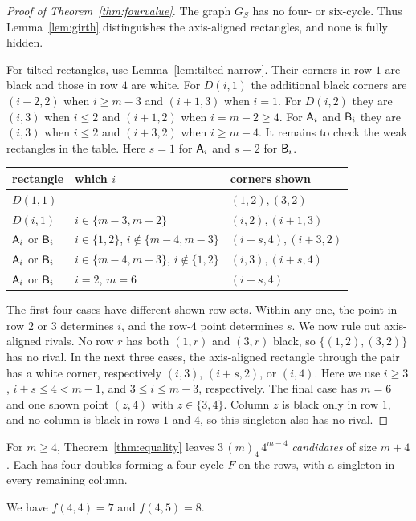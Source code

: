 \begin{proof}[Proof of Theorem~\ref{thm:fourvalue}]
The graph $G_S$ has no four- or six-cycle. Thus Lemma~\ref{lem:girth}
distinguishes the axis-aligned rectangles, and none is fully hidden.

For tilted rectangles, use Lemma~\ref{lem:tilted-narrow}.
Their corners in row $1$ are black and those in row $4$ are white.
For $D(i,1)$ the additional black corners are $(i+2,2)$ when $i\ge m-3$
and $(i+1,3)$ when $i=1$. For $D(i,2)$ they are $(i,3)$ when $i\le2$
and $(i+1,2)$ when $i=m-2\ge4$. For $\mathsf{A}_i$ and $\mathsf{B}_i$ they are
$(i,3)$ when $i\le2$ and $(i+3,2)$ when $i\ge m-4$.
It remains to check the weak rectangles in the table. Here $s=1$ for $\mathsf{A}_i$
and $s=2$ for $\mathsf{B}_i$.
\begin{center}\small
\begin{tabular}{@{}lll@{}}
\toprule
rectangle & which $i$ & corners shown\\
\midrule
$D(1,1)$ & & $(1,2),(3,2)$\\
$D(i,1)$ & $i\in\{m-3,m-2\}$ & $(i,2),(i+1,3)$\\
$\mathsf{A}_i$ or $\mathsf{B}_i$ & $i\in\{1,2\}$, $i\notin\{m-4,m-3\}$ & $(i+s,4),(i+3,2)$\\
$\mathsf{A}_i$ or $\mathsf{B}_i$ & $i\in\{m-4,m-3\}$, $i\notin\{1,2\}$ & $(i,3),(i+s,4)$\\
$\mathsf{A}_i$ or $\mathsf{B}_i$ & $i=2$, $m=6$ & $(i+s,4)$\\
\bottomrule
\end{tabular}
\end{center}
The first four cases have different shown row sets. Within any one,
the point in row $2$ or $3$ determines $i$, and the row-$4$ point
determines $s$.
We now rule out axis-aligned rivals. No row $r$ has
both $(1,r)$ and $(3,r)$ black, so $\{(1,2),(3,2)\}$ has no rival. In the next three cases, the axis-aligned rectangle
through the pair has a white corner, respectively $(i,3)$, $(i+s,2)$,
or $(i,4)$. Here we use $i\ge3$, $i+s\le4<m-1$, and
$3\le i\le m-3$, respectively. The final case has $m=6$ and one
shown point $(z,4)$ with $z\in\{3,4\}$. Column $z$ is black only in
row $1$, and no column is black in rows $1$ and $4$, so this singleton
also has no rival.
\end{proof}

For $m\ge4$, Theorem~\ref{thm:equality} leaves
$3\,(m)_4\,4^{m-4}$ \emph{candidates} of size $m+4$.
Each has four doubles forming a four-cycle $F$ on the rows,
with a singleton in every remaining column.

\begin{corollary}\label{cor:fourboundary}
We have $f(4,4)=7$ and $f(4,5)=8$.
\end{corollary}

